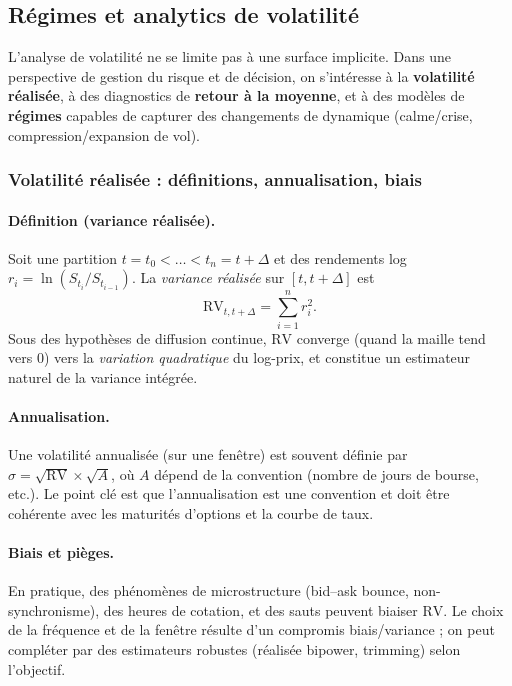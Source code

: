 \documentclass[11pt,a4paper]{article}
\newcommand{\1}{\mathbf{1}}
\begin{document}
\subsection{R\'egimes et analytics de volatilit\'e}

L'analyse de volatilité ne se limite pas \`a une surface implicite. Dans une perspective de gestion du risque et de
d\'ecision, on s'int\'eresse \`a la \textbf{volatilité r\'ealis\'ee}, \`a des diagnostics de \textbf{retour \`a la moyenne},
et \`a des mod\`eles de \textbf{r\'egimes} capables de capturer des changements de dynamique (calme/crise, compression/expansion de vol).

\subsubsection{Volatilit\'e r\'ealis\'ee : d\'efinitions, annualisation, biais}

\paragraph{D\'efinition (variance r\'ealis\'ee).}
Soit une partition $t=t_0<\dots<t_n=t+\Delta$ et des rendements log
$r_i=\ln(S_{t_i}/S_{t_{i-1}})$. La \emph{variance r\'ealis\'ee} sur $[t,t+\Delta]$ est
\[
\mathrm{RV}_{t,t+\Delta}=\sum_{i=1}^n r_i^2.
\]
Sous des hypoth\`eses de diffusion continue, $\mathrm{RV}$ converge (quand la maille tend vers $0$) vers la \emph{variation quadratique}
du log-prix, et constitue un estimateur naturel de la variance int\'egr\'ee.

\paragraph{Annualisation.}
Une volatilité annualis\'ee (sur une fen\^etre) est souvent d\'efinie par $\widehat\sigma=\sqrt{\mathrm{RV}}\times\sqrt{A}$,
o\`u $A$ d\'epend de la convention (nombre de jours de bourse, etc.). Le point cl\'e est que l'annualisation est une convention
et doit \^etre coh\'erente avec les maturit\'es d'options et la courbe de taux.

\paragraph{Biais et pi\`eges.}
En pratique, des ph\'enom\`enes de microstructure (bid--ask bounce, non-synchronisme), des heures de cotation, et des sauts
peuvent biaiser $\mathrm{RV}$. Le choix de la fr\'equence et de la fen\^etre r\'esulte d'un compromis biais/variance ; on peut
compl\'eter par des estimateurs robustes (r\'ealis\'ee bipower, trimming) selon l'objectif.
\end{document}

